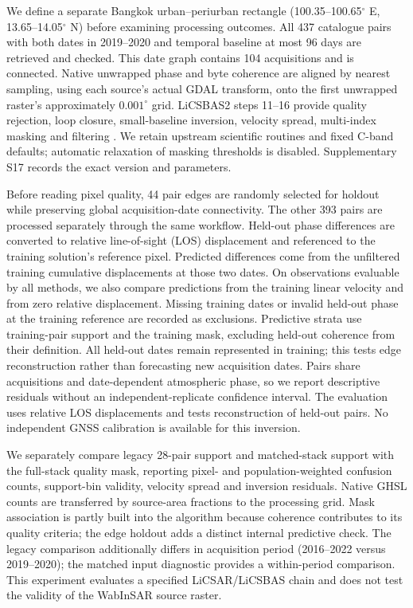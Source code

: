 We define a separate Bangkok urban--periurban rectangle (100.35--100.65$^\circ$ E, 13.65--14.05$^\circ$ N) before examining processing outcomes. All 437 catalogue pairs with both dates in 2019--2020 and temporal baseline at most 96 days are retrieved and checked. This date graph contains 104 acquisitions and is connected. Native unwrapped phase and byte coherence are aligned by nearest sampling, using each source's actual GDAL transform, onto the first unwrapped raster's approximately $0.001^\circ$ grid. LiCSBAS2 steps 11--16 provide quality rejection, loop closure, small-baseline inversion, velocity spread, multi-index masking and filtering \citep{morishita2020licsbas,licsbas2}. We retain upstream scientific routines and fixed C-band defaults; automatic relaxation of masking thresholds is disabled. Supplementary S17 records the exact version and parameters.

Before reading pixel quality, 44 pair edges are randomly selected for holdout while preserving global acquisition-date connectivity. The other 393 pairs are processed separately through the same workflow. Held-out phase differences are converted to relative line-of-sight (LOS) displacement and referenced to the training solution's reference pixel. Predicted differences come from the unfiltered training cumulative displacements at those two dates. On observations evaluable by all methods, we also compare predictions from the training linear velocity and from zero relative displacement. Missing training dates or invalid held-out phase at the training reference are recorded as exclusions. Predictive strata use training-pair support and the training mask, excluding held-out coherence from their definition. All held-out dates remain represented in training; this tests edge reconstruction rather than forecasting new acquisition dates. Pairs share acquisitions and date-dependent atmospheric phase, so we report descriptive residuals without an independent-replicate confidence interval. The evaluation uses relative LOS displacements and tests reconstruction of held-out pairs. No independent GNSS calibration is available for this inversion.

We separately compare legacy 28-pair support and matched-stack support with the full-stack quality mask, reporting pixel- and population-weighted confusion counts, support-bin validity, velocity spread and inversion residuals. Native GHSL counts are transferred by source-area fractions to the processing grid. Mask association is partly built into the algorithm because coherence contributes to its quality criteria; the edge holdout adds a distinct internal predictive check. The legacy comparison additionally differs in acquisition period (2016--2022 versus 2019--2020); the matched input diagnostic provides a within-period comparison. This experiment evaluates a specified LiCSAR/LiCSBAS chain and does not test the validity of the WabInSAR source raster.
